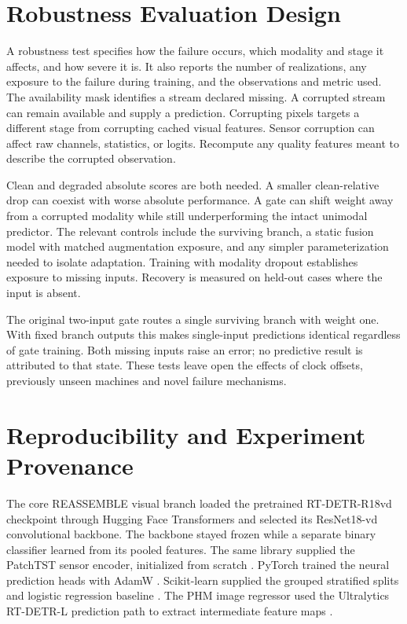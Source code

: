 \section{Robustness Evaluation Design}
A robustness test specifies how the failure occurs, which modality and stage it affects, and how severe it is. It also reports the number of realizations, any exposure to the failure during training, and the observations and metric used. The availability mask identifies a stream declared missing. A corrupted stream can remain available and supply a prediction. Corrupting pixels targets a different stage from corrupting cached visual features. Sensor corruption can affect raw channels, statistics, or logits. Recompute any quality features meant to describe the corrupted observation.

Clean and degraded absolute scores are both needed. A smaller clean-relative drop can coexist with worse absolute performance. A gate can shift weight away from a corrupted modality while still underperforming the intact unimodal predictor. The relevant controls include the surviving branch, a static fusion model with matched augmentation exposure, and any simpler parameterization needed to isolate adaptation. Training with modality dropout establishes exposure to missing inputs. Recovery is measured on held-out cases where the input is absent.

The original two-input gate routes a single surviving branch with weight one. With fixed branch outputs this makes single-input predictions identical regardless of gate training. Both missing inputs raise an error; no predictive result is attributed to that state. These tests leave open the effects of clock offsets, previously unseen machines and novel failure mechanisms.

\section{Reproducibility and Experiment Provenance}
The core REASSEMBLE visual branch loaded the pretrained RT-DETR-R18vd checkpoint through Hugging Face Transformers and selected its ResNet18-vd convolutional backbone. The backbone stayed frozen while a separate binary classifier learned from its pooled features. The same library supplied the PatchTST sensor encoder, initialized from scratch \citep{Wolf2020Transformers}. PyTorch trained the neural prediction heads with AdamW \citep{Paszke2019PyTorch}. Scikit-learn supplied the grouped stratified splits and logistic regression baseline \citep{Pedregosa2011ScikitLearn}. The PHM image regressor used the Ultralytics RT-DETR-L prediction path to extract intermediate feature maps \citep{UltralyticsRTDETR}.

